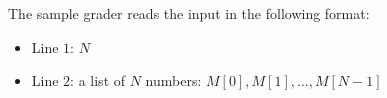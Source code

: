 The sample grader reads the input in the following format:
\begin{itemize}
\item Line $1$: $N$
\item Line $2$: a list of $N$ numbers: $M[0], M[1], \dots, M[N-1]$
\end{itemize}